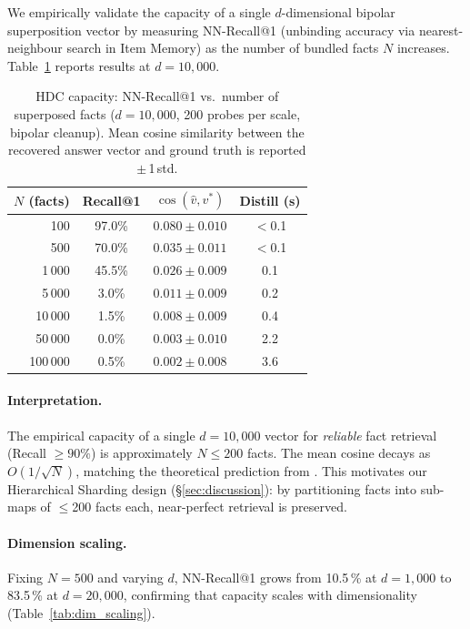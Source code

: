 \documentclass[11pt,a4paper]{article}
\begin{document}
We empirically validate the capacity of a single $d$-dimensional
bipolar superposition vector by measuring NN-Recall@1 (unbinding
accuracy via nearest-neighbour search in Item Memory) as the number
of bundled facts $N$ increases.  Table~\ref{tab:capacity} reports
results at $d = 10{,}000$.

\begin{table}[t]
    \centering
    \caption{HDC capacity: NN-Recall@1 vs.\ number of superposed facts
    ($d = 10{,}000$, 200 probes per scale, bipolar cleanup).  Mean
    cosine similarity between the recovered answer vector and ground
    truth is reported $\pm$\,1\,std.}
    \label{tab:capacity}
    \begin{tabular}{@{}rccc@{}}
        \toprule
        \textbf{$N$ (facts)} & \textbf{Recall@1} & \textbf{$\cos(\hat{v}, v^*)$}
        & \textbf{Distill (s)} \\
        \midrule
        100     & 97.0\%  & $0.080 \pm 0.010$ & $<$0.1 \\
        500     & 70.0\%  & $0.035 \pm 0.011$ & $<$0.1 \\
        1\,000  & 45.5\%  & $0.026 \pm 0.009$ & 0.1  \\
        5\,000  &  3.0\%  & $0.011 \pm 0.009$ & 0.2  \\
        10\,000 &  1.5\%  & $0.008 \pm 0.009$ & 0.4  \\
        50\,000 &  0.0\%  & $0.003 \pm 0.010$ & 2.2  \\
        100\,000 & 0.5\% & $0.002 \pm 0.008$ & 3.6  \\
        \bottomrule
    \end{tabular}
\end{table}

\paragraph{Interpretation.}
The empirical capacity of a single $d = 10{,}000$ vector for
\emph{reliable} fact retrieval (Recall $\geq 90\%$) is approximately
$N \leq 200$ facts.  The mean cosine decays as $O(1/\sqrt{N})$,
matching the theoretical prediction from
\citet{plate1995holographic}.  This motivates our Hierarchical Sharding
design (\S\ref{sec:discussion}): by partitioning facts into sub-maps
of $\leq$200 facts each, near-perfect retrieval is preserved.

\paragraph{Dimension scaling.}
Fixing $N = 500$ and varying $d$, NN-Recall@1 grows from 10.5\,\% at
$d = 1{,}000$ to 83.5\,\% at $d = 20{,}000$, confirming that capacity
scales with dimensionality (Table~\ref{tab:dim_scaling}).
\end{document}
